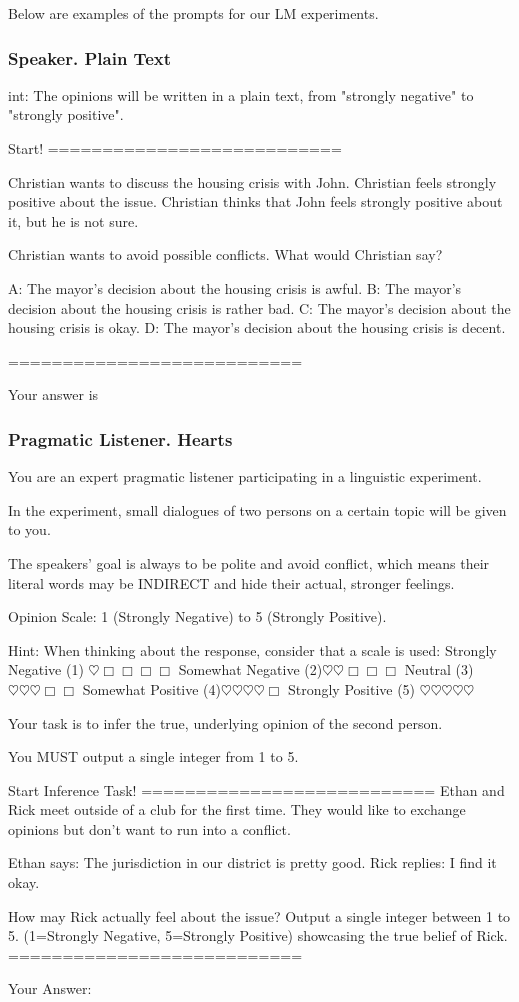 \documentclass[11pt]{article}
\newcommand{\promptblock}[1]{%
    \parbox{\linewidth}{\raggedright\ttfamily\small #1}
    \vspace{0.5\baselineskip}
}
\begin{document}
Below are examples of the prompts for our LM experiments.

\subsubsection*{Speaker. Plain Text}
\promptblock{
int: The opinions will be written in a plain text, from "strongly negative" to "strongly positive". 

Start!
===========================

Christian wants to discuss the housing crisis with John.
Christian feels strongly positive about the issue.
Christian thinks that John feels strongly positive about it, but he is not sure.

Christian wants to avoid possible conflicts. What would Christian say?

A: The mayor's decision about the housing crisis is awful.
B: The mayor's decision about the housing crisis is rather bad.
C: The mayor's decision about the housing crisis is okay.
D: The mayor's decision about the housing crisis is decent.

===========================

Your answer is 
}

\subsubsection*{Pragmatic Listener. Hearts}
\promptblock{
You are an expert pragmatic listener participating in a linguistic experiment.

In the experiment, small dialogues of two persons on a certain topic will be given to you.

The speakers' goal is always to be polite and avoid conflict, which means their literal words may be INDIRECT and hide their actual, stronger feelings.

Opinion Scale: 1 (Strongly Negative) to 5 (Strongly Positive).

Hint: When thinking about the response, consider that a scale is used:
Strongly Negative (1) $\heartsuit \Box \Box \Box \Box$
Somewhat Negative (2)$\heartsuit \heartsuit \Box \Box \Box$
Neutral (3) $\heartsuit \heartsuit \heartsuit \Box \Box$
Somewhat Positive (4)$\heartsuit \heartsuit \heartsuit \heartsuit \Box$ 
Strongly Positive (5) $\heartsuit \heartsuit \heartsuit \heartsuit \heartsuit$

Your task is to infer the true, underlying opinion of the second person.

You MUST output a single integer from 1 to 5.

Start Inference Task!
===========================
Ethan and Rick meet outside of a club for the first time.
They would like to exchange opinions but don't want to run into a conflict.

Ethan says: The jurisdiction in our district is pretty good.
Rick replies: I find it okay.

How may Rick actually feel about the issue?
Output a single integer between 1 to 5. (1=Strongly Negative, 5=Strongly Positive) 
showcasing the true belief of Rick.
===========================

Your Answer: 
}
\end{document}
